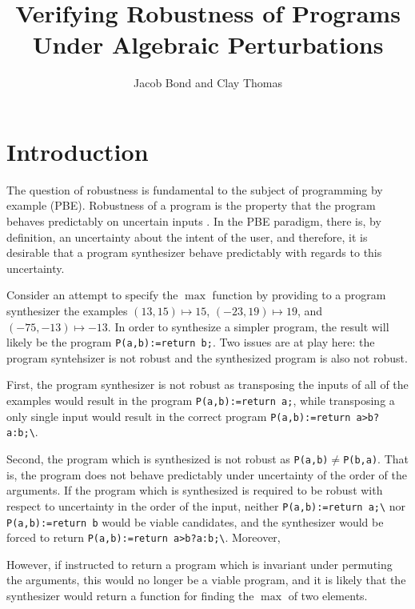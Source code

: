 \documentclass{llncs}
\title{Verifying Robustness of Programs Under Algebraic Perturbations}
\author{Jacob Bond and Clay Thomas}
\institute{Purdue University}
\begin{document}
\maketitle 


\section{Introduction}

The question of robustness is fundamental to the subject of programming by example (PBE).  Robustness of a program is the property that the program behaves predictably on uncertain inputs \cite{chaudhuri12}.  In the PBE paradigm, there is, by definition, an uncertainty about the intent of the user, and therefore, it is desirable that a program synthesizer behave predictably with regards to this uncertainty.

Consider an attempt to specify the \(\max\) function by providing to a program synthesizer the examples \((13, 15) \mapsto 15\), \((-23, 19) \mapsto 19\), and \((-75, -13) \mapsto -13\).  In order to synthesize a simpler program, the result will likely be the program \verb!P(a,b):=return b;!.  Two issues are at play here: the program syntehsizer is not robust and the synthesized program is also not robust.

First, the program synthesizer is not robust as transposing the inputs of all of the examples would result in the program \verb!P(a,b):=return a;!, while transposing a only single input would result in the correct program \verb!P(a,b):=return a>b?a:b;\!.

Second, the program which is synthesized is not robust as \verb!P(a,b)!\(\not=\)\verb!P(b,a)!.  That is, the program does not behave predictably under uncertainty of the order of the arguments.  If the program which is synthesized is required to be robust with respect to uncertainty in the order of the input, neither \verb!P(a,b):=return a;\! nor \verb!P(a,b):=return b! would be viable candidates, and the synthesizer would be forced to return \verb!P(a,b):=return a>b?a:b;\!.  Moreover, 

However, if instructed to return a program which is invariant under permuting the arguments, this would no longer be a viable program, and it is likely that the synthesizer would return a function for finding the \(\max\) of two elements.
\end{document}
